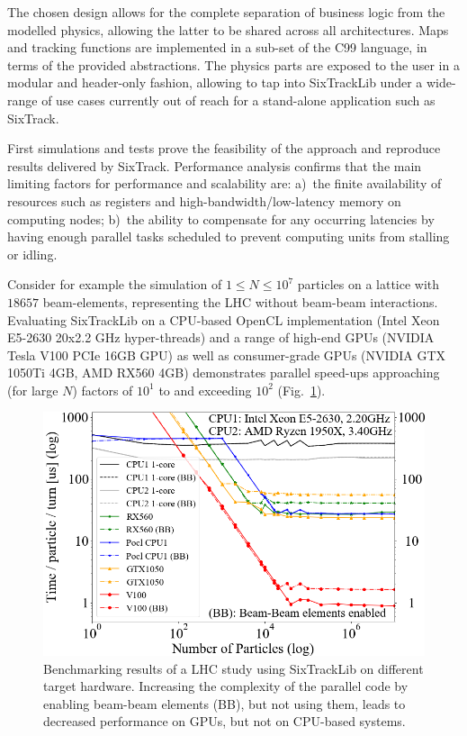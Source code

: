 \documentclass[a4paper,
              ]{jacow}
\begin{document}
The chosen design allows for the complete separation of business logic from the modelled physics, allowing the latter to be shared across all architectures. Maps and tracking functions are implemented in a sub-set of the C99 language, in terms of the provided abstractions. The physics parts are exposed to the user in a modular and header-only fashion, allowing to tap into SixTrackLib under a wide-range of use cases currently out of reach for a stand-alone application such as SixTrack.

First simulations and tests prove the feasibility of the approach and reproduce results delivered by SixTrack. Performance analysis confirms that the main limiting factors for performance and scalability are: a)~the finite availability of resources such as registers and high-bandwidth/low-latency memory on computing nodes; b)~the ability to compensate for any occurring latencies by having enough parallel tasks scheduled to prevent computing units from stalling or idling. 

Consider for example the simulation of $1 \leq N \leq 10^7$ particles on a lattice with $18657$ beam-elements, representing the LHC without beam-beam interactions. Evaluating SixTrackLib on a CPU-based OpenCL implementation (Intel Xeon E5-2630 20x2.2 GHz hyper-threads) and a range of high-end GPUs (NVIDIA Tesla V100 PCIe 16GB GPU) as well as consumer-grade GPUs (NVIDIA GTX 1050Ti 4GB, AMD RX560 4GB) demonstrates parallel speed-ups approaching (for large $N$) factors of $10^1$ to and exceeding $10^2$ (Fig.~\ref{fig:sixtracklib_results}). 
\begin{figure}[htb]
 \centering
 \includegraphics[width=\columnwidth]{devices_times_per_particle_and_turn.png}
 \caption{Benchmarking results of a LHC study using SixTrackLib on different target hardware. Increasing the complexity of the parallel code by enabling beam-beam elements (BB), but not using them, leads to decreased performance on GPUs, but not on CPU-based systems.}
 \label{fig:sixtracklib_results}
\end{figure}
\end{document}
